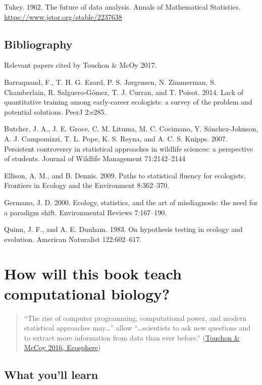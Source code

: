 \documentclass[
]{book}
\begin{document}
Tukey. 1962. The future of data analysis. Annals of Mathematical Statistics. \url{https://www.jstor.org/stable/2237638}

\hypertarget{bibliography}{%
\section{Bibliography}\label{bibliography}}

Relevant papers cited by Touchon \& McOy 2017.

Barraquand, F., T. H. G. Ezard, P. S. Jørgensen, N. Zimmerman, S. Chamberlain, R. Salguero‐Gómez, T. J. Curran, and T. Poisot. 2014. Lack of quantitative training among early‐career ecologists: a survey of the problem and potential solutions. PeerJ 2:e285.

Butcher, J. A., J. E. Groce, C. M. Lituma, M. C. Cocimano, Y. Sánchez‐Johnson, A. J. Campomizzi, T. L. Pope, K. S. Reyna, and A. C. S. Knipps. 2007. Persistent controversy in statistical approaches in wildlife sciences: a perspective of students. Journal of Wildlife Management 71:2142--2144

Ellison, A. M., and B. Dennis. 2009. Paths to statistical fluency for ecologists. Frontiers in Ecology and the Environment 8:362--370.

Germano, J. D. 2000. Ecology, statistics, and the art of misdiagnosis: the need for a paradigm shift. Environmental Reviews 7:167--190.

Quinn, J. F., and A. E. Dunham. 1983. On hypothesis testing in ecology and evolution. American Naturalist 122:602--617.

\hypertarget{how-will-this-book-teach-computational-biology}{%
\chapter{How will this book teach computational biology?}\label{how-will-this-book-teach-computational-biology}}

\begin{quote}
``The rise of computer programming, computational power, and modern statistical approaches may\ldots{}'' allow ``\ldots scientists to ask new questions and to extract more information from data than ever before.'' (\href{https://esajournals.onlinelibrary.wiley.com/doi/abs/10.1002/ecs2.1394}{Touchon \& McCoy 2016, Ecosphere})
\end{quote}

\hypertarget{what-youll-learn}{%
\section{What you'll learn}\label{what-youll-learn}}
\end{document}
